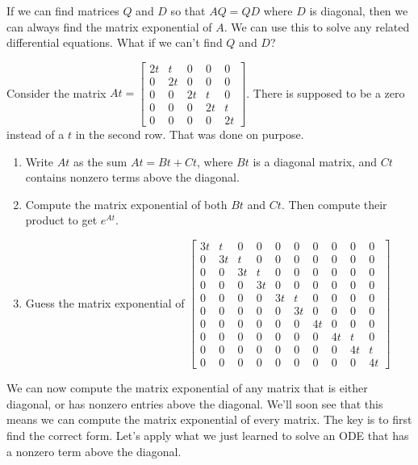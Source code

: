 If we can find matrices $Q$ and $D$ so that $AQ=QD$ where $D$ is diagonal, then we can always find the matrix exponential of $A$. We can use this to solve any related differential equations.  What if we can't find $Q$ and $D$?




\begin{problem}
Consider the matrix 
$At = 
\begin{bmatrix}
 2t&t&0&0&0\\
 0&2t&0&0&0\\
 0&0&2t&t&0\\
 0&0&0&2t&t\\
 0&0&0&0&2t
\end{bmatrix}
$. There is supposed to be a zero instead of a $t$ in the second row.  That was done on purpose. 
\begin{enumerate}
 \item Write $At$ as the sum $At=Bt+Ct$, where $Bt$ is a diagonal matrix, and $Ct$ contains nonzero terms above the diagonal. 
 \item 
{}%
Compute the matrix exponential of both $Bt$ and $Ct$. Then compute their product to get $e^{At}$.  
 \item 
{}%
Guess the matrix exponential of 
$
\begin{bmatrix}
 3t& t& 0& 0& 0& 0& 0& 0& 0& 0 \\
 0 &3t& t& 0& 0& 0& 0& 0& 0& 0 \\
 0 & 0&3t& t& 0& 0& 0& 0& 0& 0 \\
 0 & 0& 0&3t& 0& 0& 0& 0& 0& 0 \\
 0 & 0& 0& 0&3t& t& 0& 0& 0& 0 \\
 0 & 0& 0& 0& 0&3t& 0& 0& 0& 0 \\
 0 & 0& 0& 0& 0& 0&4t& 0& 0& 0 \\
 0 & 0& 0& 0& 0& 0& 0&4t& t& 0 \\
 0 & 0& 0& 0& 0& 0& 0& 0&4t& t \\
 0 & 0& 0& 0& 0& 0& 0& 0& 0&4t  
\end{bmatrix}
$
\end{enumerate}

\end{problem}




We can now compute the matrix exponential of any matrix that is either diagonal, or has nonzero entries above the diagonal.  We'll soon see that this means we can compute the matrix exponential of every matrix.  The key is to first find the correct form.  Let's apply what we just learned to solve an ODE that has a nonzero term above the diagonal.


